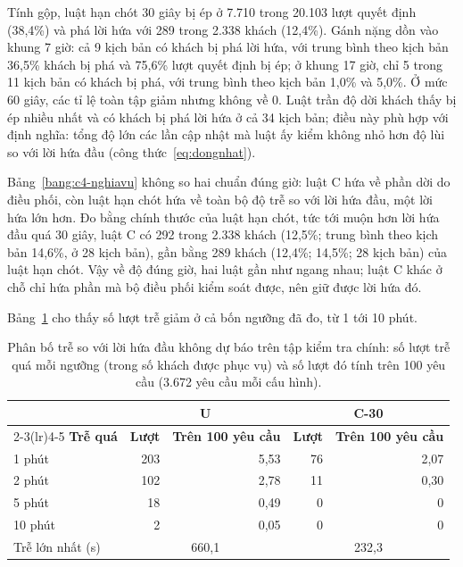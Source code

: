Tính gộp, luật hạn chót 30 giây bị ép ở 7.710 trong 20.103 lượt quyết định (38,4\%) và phá lời hứa với 289 trong
2.338 khách (12,4\%). Gánh nặng dồn vào khung 7 giờ: cả 9 kịch bản có khách bị phá lời hứa, với trung bình theo kịch
bản 36,5\% khách bị phá và 75,6\% lượt quyết định bị ép; ở khung 17 giờ, chỉ 5 trong 11 kịch bản có khách bị phá, với
trung bình theo kịch bản 1,0\% và 5,0\%. Ở mức 60 giây, các tỉ lệ toàn tập giảm nhưng không về 0. Luật trần độ dời
khách thấy bị ép nhiều nhất và có khách bị phá lời hứa ở cả 34 kịch bản; điều này phù hợp với định nghĩa: tổng độ
lớn các lần cập nhật mà luật ấy kiểm không nhỏ hơn độ lùi so với lời hứa đầu (công thức~\eqref{eq:dongnhat}).

Bảng~\ref{bang:c4-nghiavu} không so hai chuẩn đúng giờ: luật C hứa về phần dời do điều phối, còn luật hạn chót hứa
về toàn bộ độ trễ so với lời hứa đầu, một lời hứa lớn hơn. Đo bằng chính thước của luật hạn chót, tức tới muộn hơn
lời hứa đầu quá 30 giây, luật C có 292 trong 2.338 khách (12,5\%; trung bình theo kịch bản 14,6\%, ở 28 kịch bản),
gần bằng 289 khách (12,4\%; 14,5\%; 28 kịch bản) của luật hạn chót. Vậy về độ đúng giờ, hai luật gần như ngang nhau;
luật C khác ở chỗ chỉ hứa phần mà bộ điều phối kiểm soát được, nên giữ được lời hứa đó.

Bảng~\ref{bang:c4-phanbotre} cho thấy số lượt trễ giảm ở cả bốn ngưỡng đã đo, từ 1 tới 10 phút.

\begin{table}[htbp]
\centering
\caption{Phân bố trễ so với lời hứa đầu không dự báo trên tập kiểm tra chính: số lượt trễ quá mỗi ngưỡng
(trong số khách được phục vụ) và số lượt đó tính trên 100 yêu cầu (3.672 yêu cầu mỗi cấu hình).}
\label{bang:c4-phanbotre}
\small
\begin{tabular}{@{}lrrrr@{}}
\toprule
& \multicolumn{2}{c}{\textbf{U}} & \multicolumn{2}{c}{\textbf{C-30}}\\
\cmidrule(lr){2-3}\cmidrule(lr){4-5}
\textbf{Trễ quá} & \textbf{Lượt} & \textbf{Trên 100 yêu cầu} & \textbf{Lượt} & \textbf{Trên 100 yêu cầu}\\
\midrule
1 phút & 203 & 5,53 & 76 & 2,07\\
2 phút & 102 & 2,78 & 11 & 0,30\\
5 phút & 18 & 0,49 & 0 & 0\\
10 phút & 2 & 0,05 & 0 & 0\\
\midrule
Trễ lớn nhất (s) & \multicolumn{2}{c}{660,1} & \multicolumn{2}{c}{232,3}\\
\bottomrule
\end{tabular}
\end{table}

